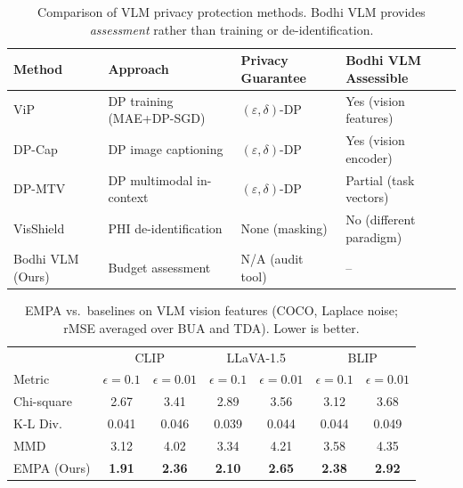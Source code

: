 \documentclass[journal,transmag]{IEEEtran}
\begin{document}
\begin{table}[t]
\centering
\caption{Comparison of VLM privacy protection methods. Bodhi VLM provides \emph{assessment} rather than training or de-identification.}
\label{tab:vlmprivacy}
\begin{tabular}{l|l|l|l}
\hline
Method & Approach & Privacy Guarantee & Bodhi VLM Assessible \\
\hline
ViP~\cite{yu2024vip} & DP training (MAE+DP-SGD) & $(\varepsilon,\delta)$-DP & Yes (vision features) \\
DP-Cap~\cite{sander2024dpcap} & DP image captioning & $(\varepsilon,\delta)$-DP & Yes (vision encoder) \\
DP-MTV~\cite{ngong2026dpmtv} & DP multimodal in-context & $(\varepsilon,\delta)$-DP & Partial (task vectors) \\
VisShield~\cite{chen2025visshield} & PHI de-identification & None (masking) & No (different paradigm) \\
Bodhi VLM (Ours) & Budget assessment & N/A (audit tool) & -- \\
\hline
\end{tabular}
\end{table}

\begin{table}[t]
\centering
\caption{EMPA vs.\ baselines on VLM vision features (COCO, Laplace noise; rMSE averaged over BUA and TDA). Lower is better.}
\label{tab:vlmemparesults}
\begin{tabular}{l|cc|cc|cc}
\hline
& \multicolumn{2}{c|}{CLIP} & \multicolumn{2}{c|}{LLaVA-1.5} & \multicolumn{2}{c}{BLIP} \\
Metric & $\epsilon{=}0.1$ & $\epsilon{=}0.01$ & $\epsilon{=}0.1$ & $\epsilon{=}0.01$ & $\epsilon{=}0.1$ & $\epsilon{=}0.01$ \\
\hline
Chi-square & 2.67 & 3.41 & 2.89 & 3.56 & 3.12 & 3.68 \\
K-L Div.   & 0.041 & 0.046 & 0.039 & 0.044 & 0.044 & 0.049 \\
MMD        & 3.12 & 4.02 & 3.34 & 4.21 & 3.58 & 4.35 \\
EMPA (Ours)& \textbf{1.91} & \textbf{2.36} & \textbf{2.10} & \textbf{2.65} & \textbf{2.38} & \textbf{2.92} \\
\hline
\end{tabular}
\end{table}
\end{document}

